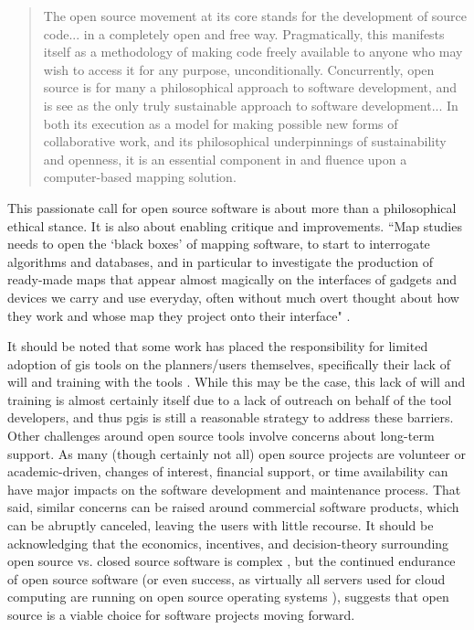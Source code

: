 \blockquote{The open source movement at its core stands for the development of source code... in a completely open and free way. Pragmatically, this manifests itself as a methodology of making code freely available to anyone who may wish to access it for any purpose, unconditionally. Concurrently, open source is for many a philosophical approach to software development, and is see as the only truly sustainable approach to software development... In both its execution as a model for making possible new forms of collaborative work, and its philosophical underpinnings of sustainability and openness, it is an essential component in and fluence upon a computer-based mapping solution.}

This passionate call for open source software is about more than a philosophical ethical stance. It is also about enabling critique and improvements. ``Map studies needs to open the `black boxes' of mapping software, to start to interrogate algorithms and databases, and in particular to investigate the production of ready-made maps that appear almost magically on the interfaces of gadgets and devices we carry and use everyday, often without much overt thought about how they work and whose map they project onto their interface" \cite{dodgeMappingModesMethods2011}.

It should be noted that some work has placed the responsibility for limited adoption of \ac{gis} tools on the planners/users themselves, specifically their lack of will and training with the tools \cite{gocmenBarriersGISUse2010}. While this may be the case, this lack of will and training is almost certainly itself due to a lack of outreach on behalf of the tool developers, and thus \ac{pgis} is still a reasonable strategy to address these barriers. Other challenges around open source tools involve concerns about long-term support. As many (though certainly not all) open source projects are volunteer or academic-driven, changes of interest, financial support, or time availability can have major impacts on the software development and maintenance process. That said, similar concerns can be raised around commercial software products, which can be abruptly canceled, leaving the users with little recourse. It should be acknowledging that the economics, incentives, and decision-theory surrounding open source vs. closed source software is complex \cite{lernerSimpleEconomicsOpen2002}, but the continued endurance of open source software (or even success, as virtually all servers used for cloud computing are running on open source operating systems \cite{vermaUbuntuLinuxMost2015}), suggests that open source is a viable choice for software projects moving forward. 


